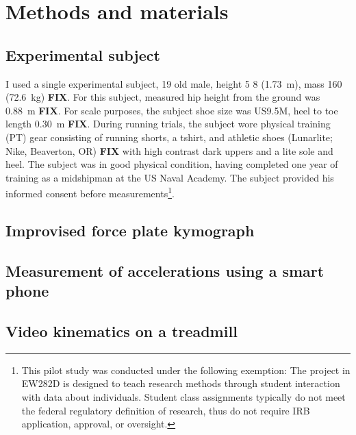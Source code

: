 \section{Methods and materials}
\label{sec:methods}

\subsection{Experimental subject}
I used a single experimental subject, \SI{19}{\year} old male, height \SI{5}{\foot} \SI{8}{\inch} (\SI{1.73}{\meter}), mass \SI{160}{\pound} (\SI{72.6}{\kilo\gram}) \textbf{FIX}. For this subject, measured hip height from the ground was \SI{0.88}{\meter} \textbf{FIX}. For scale purposes, the subject shoe size was US9.5M, heel to toe length \SI{0.30}{\meter} \textbf{FIX}. During running trials, the subject wore physical training (PT) gear consisting of running shorts, a tshirt, and athletic shoes (Lunarlite; Nike, Beaverton, OR) \textbf{FIX} with high contrast dark uppers and a lite sole and heel. The subject was in good physical condition, having completed one year of training as a midshipman at the US Naval Academy. The subject provided his informed consent before measurements\footnote{This pilot study was conducted under the following exemption: The project in EW282D is designed to teach research methods through student interaction with data about individuals. Student class assignments typically do not meet the federal regulatory definition of research, thus do not require IRB application, approval, or oversight.}.  

\subsection{Improvised force plate kymograph}

\subsection{Measurement of accelerations using a smart phone}

\subsection{Video kinematics on a treadmill}
